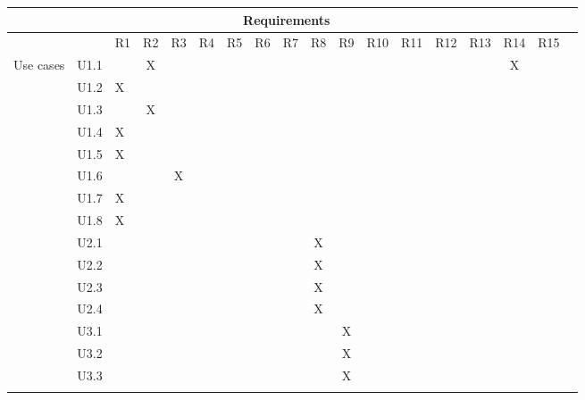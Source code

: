 \documentclass[hidelinks, 12pt, a4paper]{article}
\begin{document}
\begin{table}[H]
    \centering
        \begin{tabular}{|l|l|l|c|c|c|c|c|c|c|c|c|c|c|c|c|c|c|}
        \hline
    
            \multicolumn{17}{|c|}{Requirements} \\ \hline
            &  & R1  & R2   & R3 & R4 & R5 & R6 & R7 &R8 & R9 & R10 & R11 & R12 & R13 & R14 & R15    \\ \hline
        \multirow{29}{*}{Use cases}

        & U1.1 &    &  X     &     &   &   &   &   &   &   &   &   &   &   & X    &  \\ \cline{2-17}
        & U1.2 & X  &       &      &   &   &   &   &   &   &   &   &   &   &    &  \\ \cline{2-17}    
        & U1.3 &    &   X    &     &   &   &   &   &   &   &   &   &   &   &    &  \\ \cline{2-17}    
        & U1.4 & X  &       &      &   &   &   &   &   &   &   &   &   &   &    &  \\ \cline{2-17}    
        & U1.5 & X  &       &      &   &   &   &   &   &   &   &   &   &   &    &  \\ \cline{2-17}    
        & U1.6 &    &        &  X  &   &   &   &   &   &   &   &   &   &   &    &  \\ \cline{2-17}    
        & U1.7 & X  &       &      &   &   &   &   &   &   &   &   &   &   &    &  \\ \cline{2-17}    
        & U1.8 & X  &       &      &   &   &   &   &   &   &   &   &   &   &    &  \\ \cline{2-17}    
        & U2.1 &    &       &      &   &   &   &   &  X &   &   &   &   &   &    &  \\ \cline{2-17}    
        & U2.2 &    &       &      &   &   &   &   &  X &   &   &   &   &   &    &  \\ \cline{2-17}    
        & U2.3 &    &       &      &   &   &   &   &  X &   &   &   &   &   &    &  \\ \cline{2-17}    
        & U2.4 &    &       &      &   &   &   &   &  X &   &   &   &   &   &    &  \\ \cline{2-17}    
        & U3.1 &    &       &      &   &   &   &   &   & X  &   &   &   &   &    &  \\ \cline{2-17}    
        & U3.2 &    &       &      &   &   &   &   &   & X  &   &   &   &   &    &  \\ \cline{2-17}    
        & U3.3 &    &       &      &   &   &   &   &   & X  &   &   &   &   &    &  \\ \cline{2-17}    

\end{tabular}
\end{table}
\end{document}
